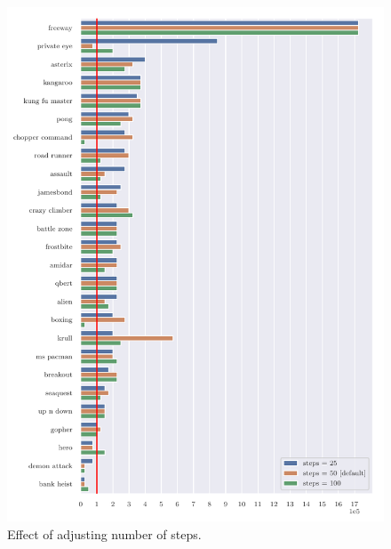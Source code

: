 \begin{figure}
\centering
\includegraphics[width=0.9\columnwidth]{figures/graph_Effect_of_adjusting_number_of_steps.pdf}
\caption{Effect of adjusting number of steps.} 
\label{fig:adj_steps}
\end{figure}


